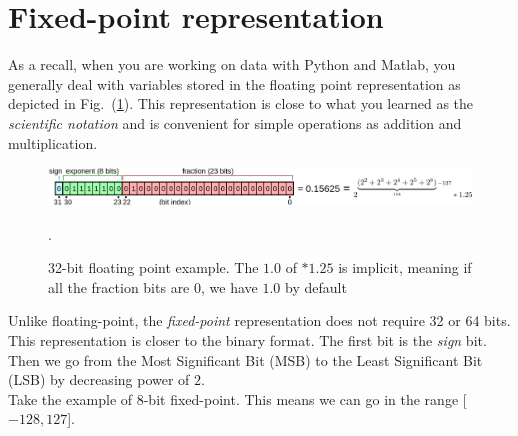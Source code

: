 \section{Fixed-point representation}
%
As a recall, when you are working on data with Python and Matlab, you generally deal with variables stored in the floating point representation as depicted in Fig.~(\ref{fig: 32}). This representation is close to what you learned as the \emph{scientific notation} and is convenient for simple operations as addition and multiplication.
%
\begin{figure}[H]
    \centering
    \includegraphics[width=\textwidth]{figs/Floating32.png}
    \caption{32-bit floating point example. The $1.0$ of $*1.25$ is implicit, meaning if all the fraction bits are $0$, we have $1.0$ by default}.
    \label{fig: 32}
\end{figure}
%
Unlike floating-point, the \emph{fixed-point} representation does not require 32 or 64 bits. This representation is closer to the binary format. The first bit is the \emph{sign} bit. Then we go from the Most Significant Bit (MSB) to the Least Significant Bit (LSB) by decreasing power of $2$. \\
Take the example of $8$-bit fixed-point. This means we can go in the range [$-128, 127$].
%
